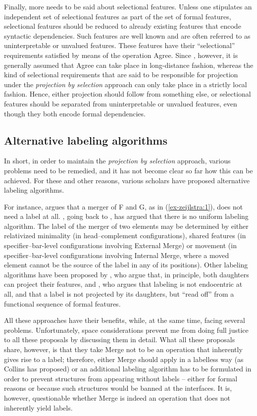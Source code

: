 \documentclass[output=paper
,modfonts
,nonflat]{langsci/langscibook}
\begin{document}
Finally, more needs to be said about selectional features. Unless one stipulates an independent set of selectional features as part of the set of formal features, selectional features should be reduced to already existing features that encode syntactic dependencies. Such features are well known and are often referred to as uninterpretable or unvalued features. These features have their ``selectional'' requirements satisfied by means of the operation Agree. Since \citet{Chomsky2001}, however, it is generally assumed that Agree can take place in long-distance fashion, whereas the kind of selectional requirements that are said to be responsible for projection under the \textit{projection by selection} approach can only take place in a strictly local fashion. Hence, either projection should follow from something else, or selectional features should be separated from uninterpretable or unvalued features, even though they both encode formal dependencies.

\subsection{Alternative labeling algorithms}
In short, in order to maintain the \textit{projection by selection} approach, various problems need to be remedied, and it has not become clear so far how this can be achieved. For these and other reasons, various scholars have proposed alternative labeling algorithms.

For instance, \citet{Collins2002} argues that a merger of F and G, as in (\ref{ex-zeijlstra:1}), does not need a label at all. \citet{Chomsky2013, Chomsky2015}, going back to \citet{Chomsky2008}, has argued that there is no uniform labeling algorithm. The label of the merger of two elements may be determined by either relativized minimality (in head–complement configurations), shared features (in specifier–bar-level configurations involving External Merge) or movement (in specifier–bar-level configurations involving Internal Merge, where a moved element cannot be the source of the label in any of its positions). Other labeling algorithms have been proposed by \citet{Cecchetto_Donati2010, Cecchetto_Donati2015}, who argue that, in principle, both daughters can project their features, and \citet{Adger2013}, who argues that labeling is not endocentric at all, and that a label is not projected by its daughters, but ``read off'' from a functional sequence of formal features.

All these approaches have their benefits, while, at the same time, facing several problems. Unfortunately, space considerations prevent me from doing full justice to all these proposals by discussing them in detail. What all these proposals share, however, is that they take Merge not to be an operation that inherently gives rise to a label; therefore, either Merge should apply in a labelless way (as Collins has proposed) or an additional labeling algorithm has to be formulated in order to prevent structures from appearing without labels – either for formal reasons or because such structures would be banned at the interfaces. It is, however, questionable whether Merge is indeed an operation that does not inherently yield labels.
\end{document}

